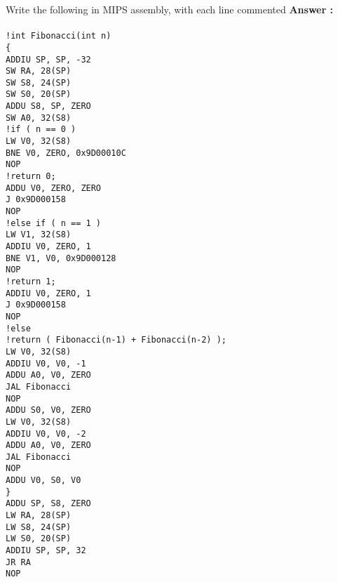 \documentclass[a4paper,11pt]{article}
\newcommand{\answer}{\textbf{Answer : }}
\begin{document}
\item Write the following in MIPS assembly, with each line commented
\answer \\
\texttt{
\\ !int Fibonacci(int n)
\\ \! \{
\\ ADDIU SP, SP, -32
\\ SW RA, 28(SP)
\\ SW S8, 24(SP)
\\ SW S0, 20(SP)
\\ ADDU S8, SP, ZERO
\\ SW A0, 32(S8)
\\ !if ( n == 0 )
\\ LW V0, 32(S8)
\\ BNE V0, ZERO, 0x9D00010C
\\ NOP}
\texttt{
\\ !return 0;
\\ ADDU V0, ZERO, ZERO
\\ J 0x9D000158
\\ NOP
\\ !else if ( n == 1 )
\\ LW V1, 32(S8)
\\ ADDIU V0, ZERO, 1
\\ BNE V1, V0, 0x9D000128
\\ NOP
\\ !return 1;
\\ ADDIU V0, ZERO, 1
\\ J 0x9D000158
\\ NOP }
\texttt{
\\ !else
\\ !return ( Fibonacci(n-1) + Fibonacci(n-2) );
\\ LW V0, 32(S8)
\\ ADDIU V0, V0, -1
\\ ADDU A0, V0, ZERO
\\ JAL Fibonacci
\\ NOP
\\ ADDU S0, V0, ZERO
\\ LW V0, 32(S8)
\\ ADDIU V0, V0, -2
\\ ADDU A0, V0, ZERO
\\ JAL Fibonacci
\\ NOP
\\ ADDU V0, S0, V0
\\ \! \} 
\\ ADDU SP, S8, ZERO
\\ LW RA, 28(SP)
\\ LW S8, 24(SP)
\\ LW S0, 20(SP)
\\ ADDIU SP, SP, 32
\\ JR RA
\\ NOP
}
\end{document}
